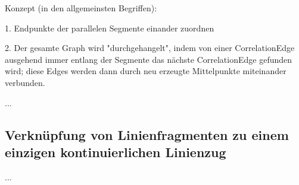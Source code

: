 \documentclass[../main/thesis.tex]{subfiles}
\begin{document}
Konzept (in den allgemeinsten Begriffen):

1. Endpunkte der parallelen Segmente einander zuordnen

2. Der gesamte Graph wird "durchgehangelt", indem von einer CorrelationEdge ausgehend immer entlang der Segmente das nächste CorrelationEdge gefunden wird; diese Edges werden dann durch neu erzeugte Mittelpunkte miteinander verbunden.





...


\subsection{Verknüpfung von Linienfragmenten zu einem einzigen kontinuierlichen Linienzug}

...


\end{document}

